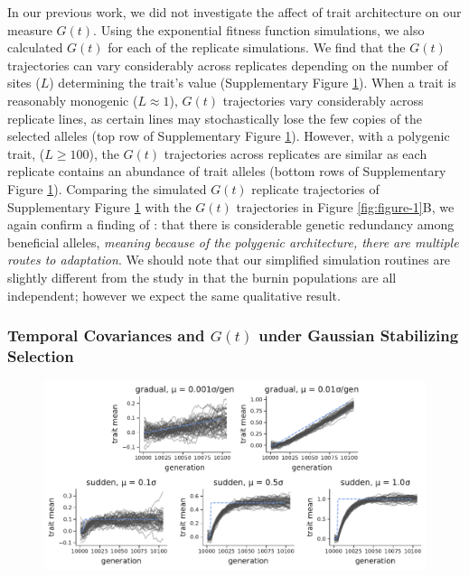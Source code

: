 \documentclass[11pt]{article}
\newcommand{\vb}[1]{{\it \color{blue} #1}}
\begin{document}
{\begin{figure}[!ht]
  \label{suppfig:sim-expfit-Gs}
\end{figure}

In our previous work, we did not investigate the affect of trait architecture
on our measure $G(t)$. Using the exponential fitness function simulations, we
also calculated $G(t)$ for each of the replicate simulations. We find that the
$G(t)$ trajectories can vary considerably across replicates depending on the
number of sites ($L$) determining the trait's value (Supplementary Figure
\ref{suppfig:sim-expfit-Gs}). When a trait is reasonably monogenic ($L \approx
1$), $G(t)$ trajectories vary considerably across replicate lines, as certain
lines may stochastically lose the few copies of the selected alleles (top row
of Supplementary Figure \ref{suppfig:sim-expfit-Gs}). However, with a polygenic
trait, ($L \ge 100$), the $G(t)$ trajectories across replicates are similar as
each replicate contains an abundance of trait alleles (bottom rows of
Supplementary Figure \ref{suppfig:sim-expfit-Gs}). Comparing the simulated
$G(t)$ replicate trajectories of Supplementary Figure
\ref{suppfig:sim-expfit-Gs} with the \textcite{Barghi2019-qy} $G(t)$
trajectories in Figure \ref{fig:figure-1}B, we again confirm a finding of
\textcite{Barghi2019-qy}: that there is considerable genetic redundancy among
beneficial alleles, \vb{meaning because of the polygenic architecture, there
are multiple routes to adaptation}. We should note that our simplified
simulation routines are slightly different from the \textcite{Barghi2019-qy}
study in that the burnin populations are all independent; however we expect the
same qualitative result. 



\subsubsection{Temporal Covariances and $G(t)$ under Gaussian Stabilizing Selection}

\begin{figure}[!ht]
  \centering
  \includegraphics[width=\textwidth]{figures/gss-zbar.pdf}


\end{figure}}
\end{document}
